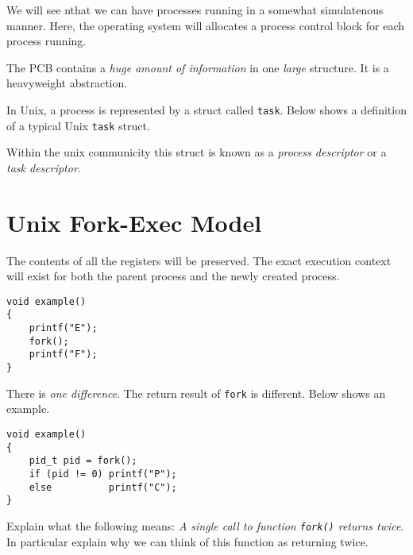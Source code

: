 We will see nthat we can have processes running in a somewhat simulatenous manner.
Here, the operating system will allocates a process control block for each process running. 


The PCB contains a \textit{huge amount of information} in
one \textit{large} structure. It is a heavyweight abstraction.


\begin{example}
In Unix, a process is represented by a struct called \lstinline{task}. 
Below shows a definition of a typical Unix \lstinline{task} struct.  
\end{example}

Within the unix communicity this struct is known as a \textit{process descriptor}
or a \textit{task descriptor}.







\section{Unix Fork-Exec Model}



The contents of all the registers will be preserved. The exact execution context 
will exist for both the parent process and the newly created process.
\begin{example}
\begin{lstlisting}
void example()
{
	printf("E");
	fork();
	printf("F");
}
\end{lstlisting}
\end{example}

There is
\textit{one difference}. The return result of \lstinline{fork} is different.
Below shows an example.

\begin{lstlisting}
void example()
{
	pid_t pid = fork();
	if (pid != 0) printf("P");
	else          printf("C");
}
\end{lstlisting}

\frmrule

\begin{example}
Explain what the following 
means: \textit{A single call to function \lstinline{fork()} returns twice}.
In particular explain why we can think of this function as returning 
twice. 
\end{example}

